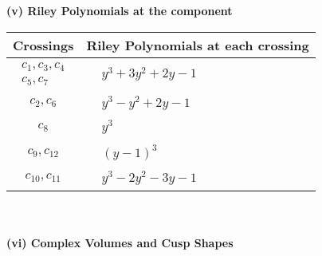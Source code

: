 \documentclass[1p]{elsarticle_modified}
\theoremstyle{definition}
\begin{document}
\newpage\renewcommand{\arraystretch}{1}
\flushleft \textbf{(v) Riley Polynomials at the component}\newline \\
\begin{tabular}{m{50pt}|m{274pt}}
Crossings & \hspace{64pt}Riley Polynomials at each crossing \\
\hline $$\begin{aligned}c_{1},c_{3},c_{4}\\c_{5},c_{7}\end{aligned}$$&$\begin{aligned}
&y^3+3 y^2+2 y-1
\end{aligned}$\\
\hline $$\begin{aligned}c_{2},c_{6}\end{aligned}$$&$\begin{aligned}
&y^3- y^2+2 y-1
\end{aligned}$\\
\hline $$\begin{aligned}c_{8}\end{aligned}$$&$\begin{aligned}
&y^3
\end{aligned}$\\
\hline $$\begin{aligned}c_{9},c_{12}\end{aligned}$$&$\begin{aligned}
&(y-1)^3
\end{aligned}$\\
\hline $$\begin{aligned}c_{10},c_{11}\end{aligned}$$&$\begin{aligned}
&y^3-2 y^2-3 y-1
\end{aligned}$\\
\hline
\end{tabular}\\~\\
\newpage\flushleft \textbf{(vi) Complex Volumes and Cusp Shapes}
\end{document}
